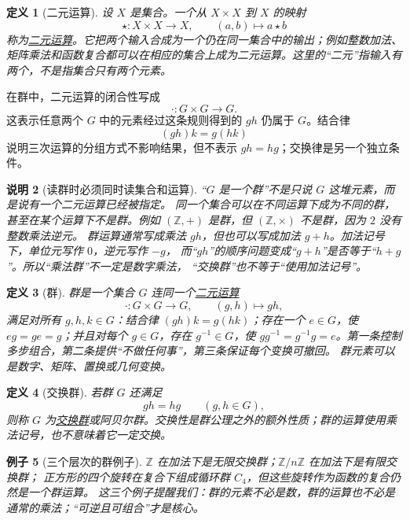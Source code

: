 \documentclass[UTF8,fontset=none,a4paper,11pt]{ctexart}
\theoremstyle{foundation-definition}
\newtheorem{definition}{定义}[section]
\theoremstyle{foundation-theorem}
\theoremstyle{foundation-proposition}
\theoremstyle{foundation-example}
\newtheorem{example}[definition]{例子}
\theoremstyle{foundation-remark}
\newtheorem{remark}[definition]{说明}
\theoremstyle{foundation-theorem}
\newcommand{\term}[2]{\hyperref[#1]{#2}}
\begin{document}
\begin{definition}[二元运算]\label{def:binary-operation}
设 \(X\) 是集合。一个从 \(X\times X\) 到 \(X\) 的映射
\[
\star:X\times X\longrightarrow X,
\qquad (a,b)\longmapsto a\star b
\]
称为\term{def:binary-operation}{二元运算}。它把两个输入合成为一个仍在同一集合中的输出；例如整数加法、矩阵乘法和函数复合都可以在相应的集合上成为二元运算。这里的“二元”指输入有两个，不是指集合只有两个元素。
\end{definition}

在群中，二元运算的闭合性写成
\[
\cdot:G\times G\longrightarrow G.
\]
这表示任意两个 \(G\) 中的元素经过这条规则得到的 \(gh\) 仍属于 \(G\)。结合律
\[
(gh)k=g(hk)
\]
说明三次运算的分组方式不影响结果，但不表示 \(gh=hg\)；交换律是另一个独立条件。

\begin{remark}[读群时必须同时读集合和运算]
“\(G\) 是一个群”不是只说 \(G\) 这堆元素，而是说有一个二元运算已经被指定。
同一个集合可以在不同运算下成为不同的群，甚至在某个运算下不是群。例如
\((\mathbb Z,+)\) 是群，但 \((\mathbb Z,\times)\) 不是群，因为 \(2\) 没有整数乘法逆元。
群运算通常写成乘法 \(gh\)，但也可以写成加法 \(g+h\)。加法记号下，单位元写作 \(0\)，逆元写作 \(-g\)，
而“\(gh\)”的顺序问题变成“\(g+h\)”是否等于“\(h+g\)”。所以“乘法群”不一定是数字乘法，
“交换群”也不等于“使用加法记号”。
\end{remark}

\begin{definition}[群]\label{def:group}
群是一个集合 \(G\) 连同一个\term{def:binary-operation}{二元运算}
\[
\cdot:G\times G\longrightarrow G,\qquad (g,h)\longmapsto gh,
\]
满足对所有 \(g,h,k\in G\)：结合律 \((gh)k=g(hk)\)；存在一个 \(e\in G\)，使
\(eg=ge=g\)；并且对每个 \(g\in G\)，存在 \(g^{-1}\in G\)，使
\(gg^{-1}=g^{-1}g=e\)。第一条控制多步组合，第二条提供“不做任何事”，第三条保证每个变换可撤回。
群元素可以是数字、矩阵、置换或几何变换。
\end{definition}

\begin{definition}[交换群]\label{def:abelian-group}
若群 \(G\) 还满足
\[
gh=hg\qquad(g,h\in G),
\]
则称 \(G\) 为\term{def:abelian-group}{交换群}或阿贝尔群。交换性是群公理之外的额外性质；群的运算使用乘法记号，也不意味着它一定交换。
\end{definition}

\begin{example}[三个层次的群例子]
\(\mathbb Z\) 在加法下是无限交换群；\(\mathbb Z/n\mathbb Z\) 在加法下是有限交换群；
正方形的四个旋转在复合下组成循环群 \(C_4\)，但这些旋转作为函数的复合仍然是一个群运算。
这三个例子提醒我们：群的元素不必是数，群的运算也不必是通常的乘法；“可逆且可组合”才是核心。
\end{example}
\end{document}
